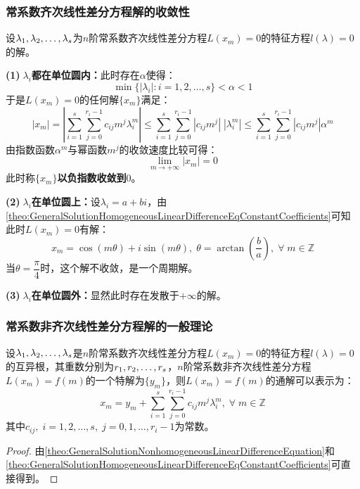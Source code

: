 \subsubsection{常系数齐次线性差分方程解的收敛性}
\begin{derivation}
	设$\lambda_1, \lambda_2, \dots, \lambda_{s}$为$n$阶常系数齐次线性差分方程$L(x_m)=0$的特征方程$l(\lambda)=0$的解。\par
	\textbf{(1)$\;\lambda_i$都在单位圆内：}此时存在$\alpha$使得：
	\begin{equation*}
		\min\{|\lambda_i|:i=1,2,\dots,s\}<\alpha<1
	\end{equation*}
	于是$L(x_m)=0$的任何解$\{x_m\}$满足：
	\begin{equation*}
		|x_m|=\left|\sum_{i=1}^{s}\sum_{j=0}^{r_i-1}c_{ij}m^{j}\lambda_i^m\right|\leqslant\sum_{i=1}^{s}\sum_{j=0}^{r_i-1}|c_{ij}m^{j}|\;|\lambda_i^m|\leqslant\sum_{i=1}^{s}\sum_{j=0}^{r_i-1}|c_{ij}m^{j}|\alpha^m
	\end{equation*}
	由指数函数$\alpha^m$与幂函数$m^j$的收敛速度比较可得：
	\begin{equation*}
		\lim_{m\to+\infty}|x_m|=0
	\end{equation*}
	此时称$\{x_m\}$\textbf{以负指数收敛到$0$}。\par
	\textbf{(2)$\;\lambda_i$在单位圆上：}设$\lambda_i=a+bi$，由\cref{theo:GeneralSolutionHomogeneousLinearDifferenceEqConstantCoefficients}可知此时$L(x_m)=0$有解：
	\begin{equation*}
		x_m=\cos(m\theta)+i\sin(m\theta),\;\theta=\arctan\left(\frac{b}{a}\right),\;\forall\;m\in\mathbb{Z}
	\end{equation*}
	当$\theta=\dfrac{\pi}{4}$时，这个解不收敛，是一个周期解。\par
	\textbf{(3)$\;\lambda_i$在单位圆外：}显然此时存在发散于$+\infty$的解。
\end{derivation}
\subsubsection{常系数非齐次线性差分方程解的一般理论}
\begin{theorem}\label{theo:GeneralSolutionNonhomogeneousLinearDifferenceEqConstantCoefficients}
	设$\lambda_1, \lambda_2, \dots, \lambda_{s}$是$n$阶常系数齐次线性差分方程$L(x_m)=0$的特征方程$l(\lambda)=0$的互异根，其重数分别为$r_1, r_2, \dots, r_{s}$，$n$阶常系数非齐次线性差分方程$L(x_m)=f(m)$的一个特解为$\{y_m\}$，则$L(x_m)=f(m)$的通解可以表示为：
	\begin{equation*}
		x_m=y_m+\sum_{i=1}^{s}\sum_{j=0}^{r_i-1}c_{ij}m^{j}\lambda_i^m,\;\forall\;m\in\mathbb{Z}
	\end{equation*}
	其中$c_{ij},\;i=1,2,\dots,s,\;j=0,1,\dots,r_i-1$为常数。
\end{theorem}
\begin{proof}
	由\cref{theo:GeneralSolutionNonhomogeneousLinearDifferenceEquation}和\cref{theo:GeneralSolutionHomogeneousLinearDifferenceEqConstantCoefficients}可直接得到。
\end{proof}

